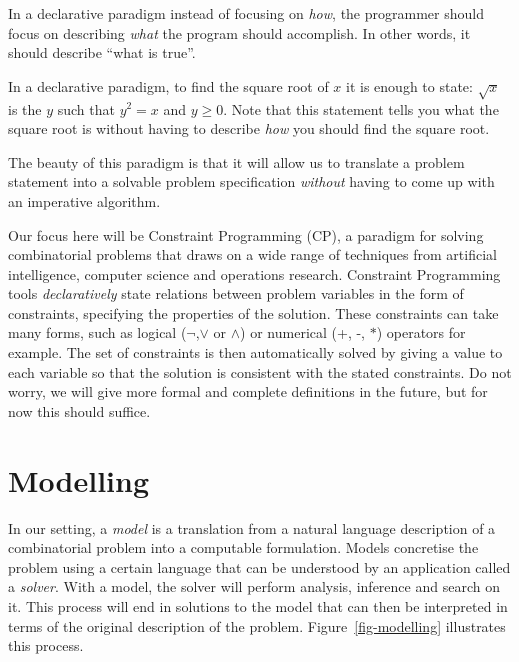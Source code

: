 In a declarative paradigm instead of focusing on \emph{how}, the programmer
should focus on describing \emph{what} the program should accomplish. 
In other words, it should describe ``what is true''.

\begin{example}
In a declarative paradigm, to find the square root of $x$ it is enough to 
state: $\sqrt{x}$ is the $y$ such that $y^2 = x$ and $y \geq 0$.
%
Note that this statement tells you what the square root is without having to
describe \emph{how} you should find the square root. 
\end{example}

The beauty of this paradigm is that it will allow us to translate a problem
statement into a solvable problem specification \emph{without} having to come
up with an imperative algorithm. 


Our focus here will be Constraint Programming (CP), a paradigm for solving
combinatorial problems that draws on a wide range of techniques from artificial
intelligence, computer science and operations research. 
%
Constraint Programming tools \emph{declaratively} state relations between problem
variables in the form of constraints, specifying the properties of the
solution. These constraints can take many forms, such as logical ($\neg$,$\vee$
or $\wedge$) or numerical (+, -, $*$) operators for example.
%
The set of constraints is then automatically solved by giving a value to each
variable so that the solution is consistent with the stated constraints. Do
not worry, we will give more formal and complete definitions in the future, but
for now this should suffice.

\section{Modelling}

In our setting, a \emph{model} is a translation from a natural language
description of a combinatorial problem into a computable formulation. Models
concretise the problem using a certain language that can be understood by an
application called a \emph{solver}. 
With a model, the solver will perform
analysis, inference and search on it. This process will end in solutions to the
model that can then be interpreted in terms of the original description of the
problem. Figure~\ref{fig-modelling} illustrates this process.

